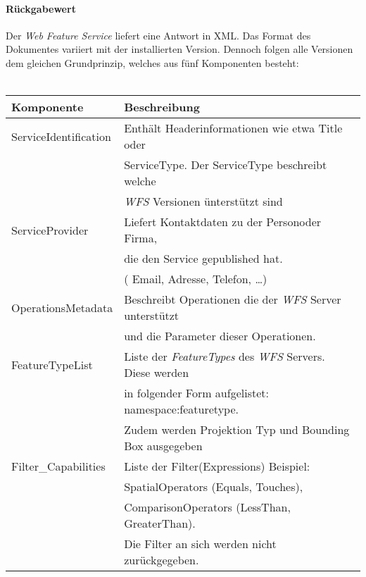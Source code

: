 \documentclass[12pt]{article}
\begin{document}
\paragraph{Rückgabewert}
 Der \emph{Web Feature Service} liefert eine Antwort in XML. Das Format des Dokumentes variiert mit der installierten Version.
 Dennoch folgen alle Versionen dem gleichen Grundprinzip, welches aus fünf Komponenten besteht:\\
 \vspace{2em}\\
 \begin{tabular}{ll}
 Komponente & Beschreibung\\
 \hline
 ServiceIdentification	&Enthält Headerinformationen wie etwa Title oder \\& 
 							ServiceType. Der ServiceType beschreibt welche\\& \emph{WFS} Versionen ünterstützt sind\\
\hline 							
 ServiceProvider	 & Liefert Kontaktdaten zu der Personoder Firma, \\&die den Service gepublished hat.\\&( Email, Adresse, Telefon, \ldots )\\
 \hline
 OperationsMetadata	& Beschreibt Operationen die der \emph{WFS} Server unterstützt\\& und die Parameter dieser Operationen.\\
 \hline
FeatureTypeList & Liste der \emph{FeatureTypes} des \emph{WFS} Servers. Diese werden\\& in folgender Form aufgelistet: namespace:featuretype. \\& Zudem werden Projektion Typ und Bounding Box ausgegeben\\
 \hline
 Filter\_Capabilities	 & Liste der Filter(Expressions) Beispiel: 
 						\\& SpatialOperators (Equals, Touches),
 						\\& ComparisonOperators (LessThan, GreaterThan). 
 						\\& Die Filter an sich werden nicht zurückgegeben.\\
 						\hline
 
 \end{tabular}
\end{document}

